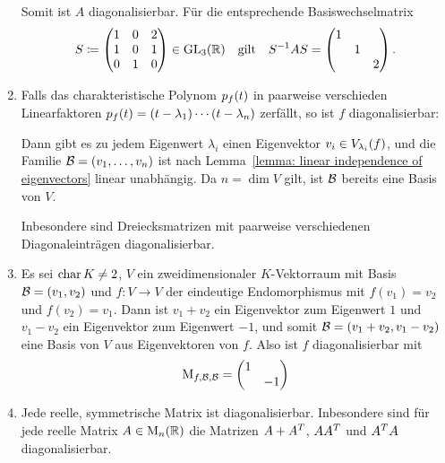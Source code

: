 \begin{example}
\begin{enumerate}
      Somit ist $A$ diagonalisierbar.
      Für die entsprechende Basiswechselmatrix
      \[
                  S
        \coloneqq \begin{pmatrix}
                    1 & 0 & 2 \\
                    1 & 0 & 1 \\
                    0 & 1 & 0
                  \end{pmatrix}
        \in       \GL{3}{\Real}
        \quad\text{gilt}\quad
        S^{-1} A S
        = \begin{pmatrix}
            1 &   &   \\
              & 1 &   \\
              &   & 2
          \end{pmatrix}.
      \]
      
    \item
      Falls das charakteristische Polynom $\charpol{f}(t)$ in paarweise verschieden Linearfaktoren $\charpol{f}(t) = (t - \lambda_1) \dotsm (t - \lambda_n)$ zerfällt, so ist $f$ diagonalisierbar:
      
      Dann gibt es zu jedem Eigenwert $\lambda_i$ einen Eigenvektor $v_i \in \eigenspace{V}{f}{\lambda_i}$, und die Familie $\basis{B} = (v_1, \dotsc, v_n)$ ist nach Lemma~\ref{lemma: linear independence of eigenvectors} linear unabhängig.
      Da $n = \dim V$ gilt, ist $\basis{B}$ bereits eine Basis von $V$.
      
      Inbesondere sind Dreiecksmatrizen mit paarweise verschiedenen Diagonaleinträgen diagonalisierbar.
      
    \item
      Es sei $\ringchar{K} \neq 2$, $V$ ein zweidimensionaler $K$-Vektorraum mit Basis $\basis{B} = (v_1, v_2)$ und $f \colon V \to V$ der eindeutige Endomorphismus mit $f(v_1) = v_2$ und $f(v_2) = v_1$.
      Dann ist $v_1 + v_2$ ein Eigenvektor zum Eigenwert $1$ und $v_1 - v_2$ ein Eigenvektor zum Eigenwert $-1$, und somit $\basis{B} = (v_1 + v_2, v_1 - v_2)$  eine Basis von $V$ aus Eigenvektoren von $f$.
      Also ist $f$ diagonalisierbar mit
      \[
          \repmatrixendo{f}{\basis{B}}
        = \begin{pmatrix*}[r]
            1 &     \\
              & -1
          \end{pmatrix*}
      \]
      
    \item
      Jede reelle, symmetrische Matrix ist diagonalisierbar.
      Inbesondere sind für jede reelle Matrix $A \in \matrices{n}{\Real}$ die Matrizen $A + \transpose{A}$, $A \transpose{A}$ und $\transpose{A} A$ diagonalisierbar.
  \end{enumerate}
\end{example}

